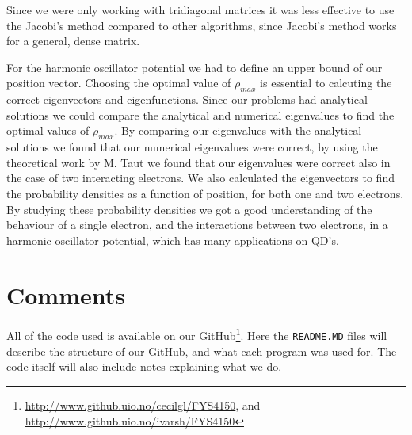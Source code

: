 \documentclass[%
 reprint,
nofootinbib,
aps,
]{revtex4-1}
\begin{document}
Since we were only working with tridiagonal matrices it was less effective to use the Jacobi's method compared to other algorithms, since Jacobi's method works for a general, dense matrix.

For the harmonic oscillator potential we had to define an upper bound of our position vector. Choosing the optimal value of $\rho_{max}$ is essential to calcuting the correct eigenvectors and eigenfunctions. Since our problems had analytical solutions we could compare the analytical and numerical eigenvalues to find the optimal values of $\rho_{max}$. By comparing our eigenvalues with the analytical solutions we found that our numerical eigenvalues were correct, by using the theoretical work by M. Taut \cite{PhysRevA.48.3561} we found that our eigenvalues were correct also in the case of two interacting electrons. We also calculated the eigenvectors to find the probability densities as a function of position, for both one and two electrons. By studying these probability densities we got a good understanding of the behaviour of a single electron, and the interactions between two electrons, in a harmonic oscillator potential, which has many applications on QD's.



\section{Comments}
All of the code used is available on our GitHub\footnote{\url{http://www.github.uio.no/cecilgl/FYS4150}, and \url{http://www.github.uio.no/ivarsh/FYS4150}}. Here the \texttt{README.MD} files will describe the structure of our GitHub, and what each program was used for. The code itself will also include notes explaining what we do.



{}

\end{document}
